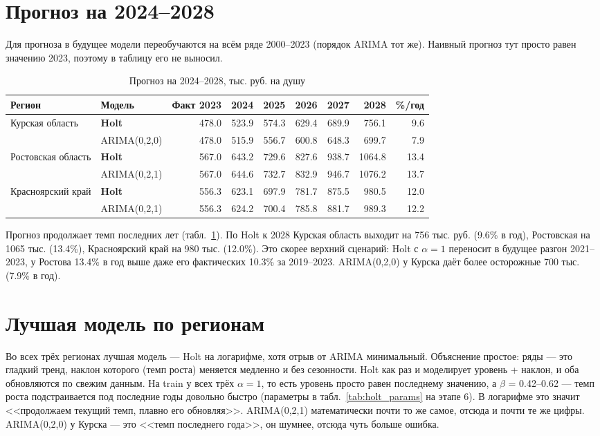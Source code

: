 \documentclass[12pt,a4paper]{report}
\begin{document}
\section{Прогноз на 2024--2028}

Для прогноза в будущее модели переобучаются на всём ряде 2000--2023 (порядок ARIMA тот же). Наивный прогноз тут просто равен значению 2023, поэтому в таблицу его не выносил.

\begin{table}[H]
\centering
\caption{Прогноз на 2024--2028, тыс. руб. на душу}
\label{tab:future}
\small
\begin{tabular}{llrrrrrrr}
\toprule
Регион & Модель & Факт 2023 & 2024 & 2025 & 2026 & 2027 & 2028 & \%/год \\
\midrule
Курская область & \textbf{Holt} & 478.0 & 523.9 & 574.3 & 629.4 & 689.9 & 756.1 & 9.6 \\
 & ARIMA(0,2,0) & 478.0 & 515.9 & 556.7 & 600.8 & 648.3 & 699.7 & 7.9 \\
\midrule
Ростовская область & \textbf{Holt} & 567.0 & 643.2 & 729.6 & 827.6 & 938.7 & 1064.8 & 13.4 \\
 & ARIMA(0,2,1) & 567.0 & 644.6 & 732.7 & 832.9 & 946.7 & 1076.2 & 13.7 \\
\midrule
Красноярский край & \textbf{Holt} & 556.3 & 623.1 & 697.9 & 781.7 & 875.5 & 980.5 & 12.0 \\
 & ARIMA(0,2,1) & 556.3 & 624.2 & 700.4 & 785.8 & 881.7 & 989.3 & 12.2 \\
\bottomrule
\end{tabular}
\end{table}

Прогноз продолжает темп последних лет (табл.~\ref{tab:future}). По Holt к 2028 Курская область выходит на 756 тыс. руб. (9.6\% в год), Ростовская на 1065 тыс. (13.4\%), Красноярский край на 980 тыс. (12.0\%). Это скорее верхний сценарий: Holt с $\alpha = 1$ переносит в будущее разгон 2021--2023, у Ростова 13.4\% в год выше даже его фактических 10.3\% за 2019--2023. ARIMA(0,2,0) у Курска даёт более осторожные 700 тыс. (7.9\% в год).

\section{Лучшая модель по регионам}

Во всех трёх регионах лучшая модель --- Holt на логарифме, хотя отрыв от ARIMA минимальный. Объяснение простое: ряды --- это гладкий тренд, наклон которого (темп роста) меняется медленно и без сезонности. Holt как раз и моделирует уровень + наклон, и оба обновляются по свежим данным. На train у всех трёх $\alpha = 1$, то есть уровень просто равен последнему значению, а $\beta$ = 0.42--0.62 --- темп роста подстраивается под последние годы довольно быстро (параметры в табл.~\ref{tab:holt_params} на этапе 6). В логарифме это значит <<продолжаем текущий темп, плавно его обновляя>>. ARIMA(0,2,1) математически почти то же самое, отсюда и почти те же цифры. ARIMA(0,2,0) у Курска --- это <<темп последнего года>>, он шумнее, отсюда чуть больше ошибка.
\end{document}
